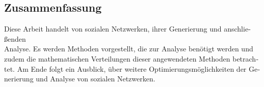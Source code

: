 \begingroup
\let\clearpage\relax
\let\cleardoublepage\relax
\let\cleardoublepage\relax

\begin{otherlanguage}{ngerman}
\chapter*{Zusammenfassung}
Diese Arbeit handelt von sozialen Netzwerken, ihrer Generierung und anschließenden \\
Analyse. Es werden Methoden vorgestellt, die zur Analyse benötigt werden und zudem die mathematischen Verteilungen dieser angewendeten Methoden betrachtet. Am Ende folgt ein Ausblick, über weitere Optimierungsmöglichkeiten der Generierung und Analyse von sozialen Netzwerken. 
\end{otherlanguage}

\endgroup
\vfill
